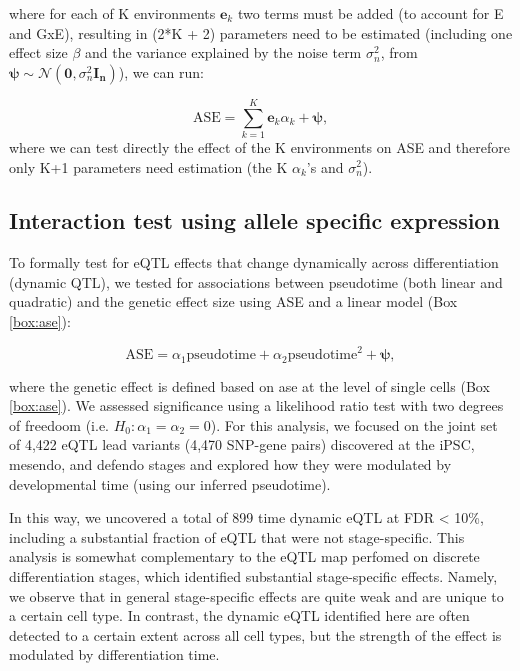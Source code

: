 \begin{Comment}
where for each of K environments $\mathbf{e}_k$ two terms must be added (to account for E and GxE), resulting in (2*K + 2) parameters need to be estimated (including one effect size $\beta$ and the variance explained by the noise term $\sigma_n^2$, from $\boldsymbol{\psi} \sim \mathcal{N}(\mathbf{0}, \sigma_n^2\mathbf{I_n})$), we can run:

\begin{equation*}
    \mathrm{ASE} = \sum_{k=1}^{K} \mathbf{e}_k\alpha_k + \boldsymbol{\psi}, 
\end{equation*}
where we can test directly the effect of the K environments on ASE and therefore only K+1 parameters need estimation (the K $\alpha_k$'s and $\sigma_n^2$).

\end{Comment}



\subsection{Interaction test using allele specific expression}

To formally test for eQTL effects that change dynamically across differentiation (dynamic QTL), we tested for associations between pseudotime (both linear and quadratic) and the genetic effect size using ASE and a linear model (Box \ref{box:ase}):

\begin{equation}
    \mathrm{ASE} = \alpha_1 \mathrm{pseudotime} + \alpha_2 \mathrm{pseudotime}^2 + \boldsymbol{\psi},
\end{equation}

where the genetic effect is defined based on \gls{ase} at the level of single cells (Box \ref{box:ase}).
We assessed significance using a likelihood ratio test with two degrees of freedoom (i.e. $H_0: \alpha_1 = \alpha_2 = 0$). 
For this analysis, we focused on the joint set of 4,422 eQTL lead variants (4,470 SNP-gene pairs) discovered at the iPSC, mesendo, and defendo stages and explored how they were modulated by developmental time (using our inferred pseudotime).

In this way, we uncovered a total of 899 time dynamic eQTL at FDR < 10\%, including a substantial fraction of eQTL that were not stage-specific.
This analysis is somewhat complementary to the eQTL map perfomed on discrete differentiation stages, which identified substantial stage-specific effects.
Namely, we observe that in general stage-specific effects are quite weak and are unique to a certain cell type.
In contrast, the dynamic eQTL identified here are often detected to a certain extent across all cell types, but the strength of the effect is modulated by differentiation time.\\

